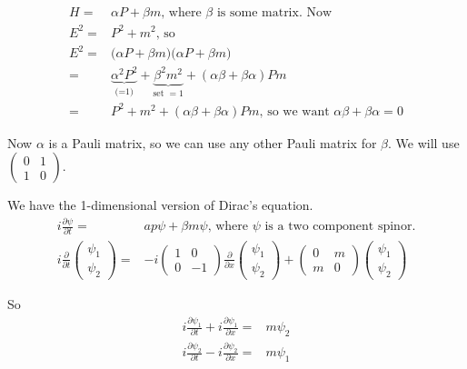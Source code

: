 \documentclass[]{article}
\begin{document}
\begin{align*}
H =& \alpha P + \beta m \text{, where $\beta$ is some matrix. Now}\\
E^2 =& P^2 + m^2 \text{, so}\\
E^2 =& \big(\alpha P + \beta m \big) \big(\alpha P + \beta m \big)\\
=& \underbrace{\alpha^2 P^2}_\text{(=1)} + \underbrace{\beta^2 m^2}_\text{set  $=1$} + (\alpha \beta + \beta \alpha) P m\\
=&  P^2 + m^2 + (\alpha \beta + \beta \alpha) P m \text{, so we want $\alpha \beta + \beta \alpha=0$}
\end{align*}

Now $\alpha$ is a Pauli matrix, so we can use any other Pauli matrix for $\beta$. We will use
$
\begin{pmatrix}
0&1\\
1&0
\end {pmatrix}
$.

We have the 1-dimensional version of Dirac's equation.
\begin{align*}
i \frac{\partial \psi}{\partial t}=& a p \psi + \beta m \psi \text{, where $\psi$ is a two component spinor.}\\
i \frac{\partial}{\partial t}\begin{pmatrix}
\psi_1\\
\psi_2
\end{pmatrix}=&-i \begin{pmatrix}
1&0\\
0&-1
\end{pmatrix} \frac{\partial}{\partial x}\begin{pmatrix}
\psi_1\\
\psi_2
\end{pmatrix} + \begin{pmatrix}
0&m\\
m&0
\end{pmatrix}\begin{pmatrix}
\psi_1\\
\psi_2
\end{pmatrix}
\end{align*}

So
\begin{align*}
i\frac{\partial \psi_1}{\partial t} + i\frac{\partial \psi_1}{\partial x}=&m \psi_2\\
i\frac{\partial \psi_2}{\partial t} - i\frac{\partial \psi_2}{\partial x}=&m \psi_1
\end{align*}
\end{document}
